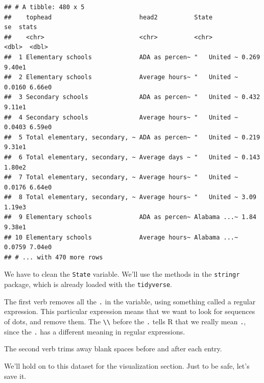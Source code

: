 \documentclass[12pt,letterpaperpaper,openany]{book}
\newenvironment{Shaded}{\begin{snugshade}}{\end{snugshade}}
\newcommand{\CharTok}[1]{\textcolor[rgb]{0.31,0.60,0.02}{#1}}
\newcommand{\DataTypeTok}[1]{\textcolor[rgb]{0.13,0.29,0.53}{#1}}
\newcommand{\KeywordTok}[1]{\textcolor[rgb]{0.13,0.29,0.53}{\textbf{#1}}}
\newcommand{\NormalTok}[1]{#1}
\newcommand{\OperatorTok}[1]{\textcolor[rgb]{0.81,0.36,0.00}{\textbf{#1}}}
\newcommand{\StringTok}[1]{\textcolor[rgb]{0.31,0.60,0.02}{#1}}
\begin{document}
\begin{verbatim}
## # A tibble: 480 x 5
##    tophead                        head2          State            se  stats
##    <chr>                          <chr>          <chr>         <dbl>  <dbl>
##  1 Elementary schools             ADA as percen~ "   United ~ 0.269  9.40e1
##  2 Elementary schools             Average hours~ "   United ~ 0.0160 6.66e0
##  3 Secondary schools              ADA as percen~ "   United ~ 0.432  9.11e1
##  4 Secondary schools              Average hours~ "   United ~ 0.0403 6.59e0
##  5 Total elementary, secondary, ~ ADA as percen~ "   United ~ 0.219  9.31e1
##  6 Total elementary, secondary, ~ Average days ~ "   United ~ 0.143  1.80e2
##  7 Total elementary, secondary, ~ Average hours~ "   United ~ 0.0176 6.64e0
##  8 Total elementary, secondary, ~ Average hours~ "   United ~ 3.09   1.19e3
##  9 Elementary schools             ADA as percen~ Alabama ...~ 1.84   9.38e1
## 10 Elementary schools             Average hours~ Alabama ...~ 0.0759 7.04e0
## # ... with 470 more rows
\end{verbatim}

We have to clean the \texttt{State} variable. We'll use the methods in the \texttt{stringr}
package, which is already loaded with the \texttt{tidyverse}.

\begin{Shaded}
\end{Shaded}

The first verb removes all the \texttt{.} in the variable, using something called a regular expression.
This particular expression means that we want to look for sequences of dots, and remove them.
The \texttt{\textbackslash{}\textbackslash{}} before the \texttt{.} tells R that we really mean \texttt{.}, since the \texttt{.} has a different meaning in
regular expressions.

The second verb trims away blank spaces before and after each entry.

We'll hold on to this dataset for the visualization section. Just to be safe, let's
save it.
\end{document}
